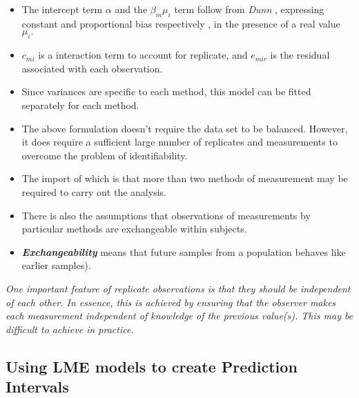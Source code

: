\begin{itemize}
\item The intercept term $\alpha$ and the $\beta_{m}\mu_{i}$ term follow
from \textit{Dunn} \cite{DunnSEME}, expressing constant and proportional bias
respectively , in the presence of a real value $\mu_{i}.$
\item $c_{mi}$ is a interaction term to account for replicate, and
 $e_{mir}$ is the residual associated with each observation.
\item Since variances are specific to each method, this model can be
fitted separately for each method.
\end{itemize}


%
\begin{itemize}
\item The above formulation doesn't require the data set to be balanced.
However, it does require a sufficient large number of replicates
and measurements to overcome the problem of identifiability. 
\item The
import of which is that more than two methods of measurement may
be required to carry out the analysis. 
\end{itemize}


%
\begin{itemize}
\item There is also the
assumptions that observations of measurements by particular
methods are exchangeable within subjects. \item \textbf{\textit{Exchangeability}} means
that future samples from a population behaves like earlier
samples).
\end{itemize}


%
\emph{
One important feature of replicate observations is that they should be independent
of each other. In essence, this is achieved by ensuring that the observer makes each
measurement independent of knowledge of the previous value(s). This may be difficult
to achieve in practice.}


\subsection*{Using LME models to create Prediction Intervals}


